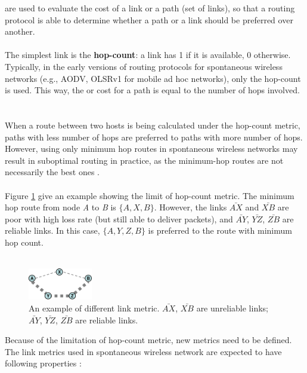  are used to evaluate the cost of a link or a path (set of links), so that a routing protocol is able to determine whether a path or a link should be preferred over another. \ \\ \ \\
%
The simplest link  is the {\bf hop-count}: a link has  1 if it is available, 0 otherwise. Typically, in the early versions of routing protocols for spontaneous wireless networks (e.g., AODV, OLSRv1 for mobile ad hoc networks), only the hop-count  is used. This way, the  or cost for a path is equal to the number of hops involved. \ \\ \ \\
%
When a route between two hosts is being calculated under the hop-count metric, paths with less number of hops are preferred to paths with more number of hops. However, using only minimum hop routes in spontaneous wireless networks may result in suboptimal routing in practice, as the minimum-hop routes are not necessarily the best ones \cite{couto03, wang95}. \ \\ \ \\
%
Figure \ref{f:metric} give an example showing the limit of hop-count metric. The minimum hop route from node \textit{A} to \textit{B} is $\{A,X,B\}$. However, the links $\bar{AX}$ and $\bar{XB}$ are poor with high loss rate (but still able to deliver packets), and $\bar{AY}$, $\bar{YZ}$, $\bar{ZB}$ are reliable links. In this case, $\{A,Y,Z,B\}$ is preferred to the route with minimum hop count. \ \\ \ \\
%
\begin{figure}
\centering
\includegraphics[width=0.25\textwidth]{Figures/axb-crop.pdf}
\caption{An example of different link metric. $\bar{AX}$, $\bar{XB}$ are unreliable links; $\bar{AY}$, $\bar{YZ}$, $\bar{ZB}$ are reliable links.}
\label{f:metric}
\end{figure}
%
Because of the limitation of hop-count metric, new metrics need to be defined. The link metrics used in spontaneous wireless network are expected to have following properties \cite{metrics}:

